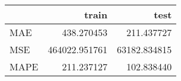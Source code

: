\begin{tabular}{lrr}
\toprule
{} &          train &          test \\
\midrule
MAE  &     438.270453 &    211.437727 \\
MSE  &  464022.951761 &  63182.834815 \\
MAPE &     211.237127 &    102.838440 \\
\bottomrule
\end{tabular}
